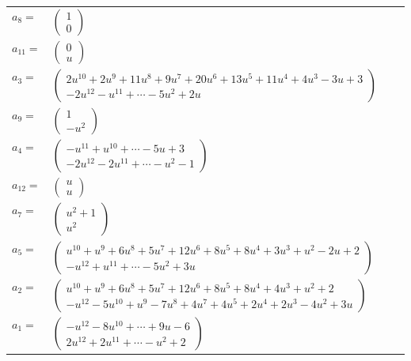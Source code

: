 \documentclass[1p]{elsarticle_modified}
\theoremstyle{definition}
\begin{document}
\begin{tabular}{m{7pt} m{180pt} m{7pt} m{180pt} }
\flushright $a_{8}=$&$\begin{pmatrix}1\\0\end{pmatrix}$ \\
\flushright $a_{11}=$&$\begin{pmatrix}0\\u\end{pmatrix}$ \\
\flushright $a_{3}=$&$\begin{pmatrix}2 u^{10}+2 u^9+11 u^8+9 u^7+20 u^6+13 u^5+11 u^4+4 u^3-3 u+3\\-2 u^{12}- u^{11}+\cdots-5 u^2+2 u\end{pmatrix}$ \\
\flushright $a_{9}=$&$\begin{pmatrix}1\\- u^2\end{pmatrix}$ \\
\flushright $a_{4}=$&$\begin{pmatrix}- u^{11}+u^{10}+\cdots-5 u+3\\-2 u^{12}-2 u^{11}+\cdots- u^2-1\end{pmatrix}$ \\
\flushright $a_{12}=$&$\begin{pmatrix}u\\u\end{pmatrix}$ \\
\flushright $a_{7}=$&$\begin{pmatrix}u^2+1\\u^2\end{pmatrix}$ \\
\flushright $a_{5}=$&$\begin{pmatrix}u^{10}+u^9+6 u^8+5 u^7+12 u^6+8 u^5+8 u^4+3 u^3+u^2-2 u+2\\- u^{12}+u^{11}+\cdots-5 u^2+3 u\end{pmatrix}$ \\
\flushright $a_{2}=$&$\begin{pmatrix}u^{10}+u^9+6 u^8+5 u^7+12 u^6+8 u^5+8 u^4+4 u^3+u^2+2\\- u^{12}-5 u^{10}+u^9-7 u^8+4 u^7+4 u^5+2 u^4+2 u^3-4 u^2+3 u\end{pmatrix}$ \\
\flushright $a_{1}=$&$\begin{pmatrix}- u^{12}-8 u^{10}+\cdots+9 u-6\\2 u^{12}+2 u^{11}+\cdots- u^2+2\end{pmatrix}$ \\

\end{tabular}
\end{document}
